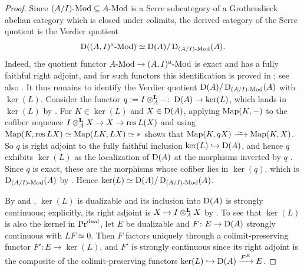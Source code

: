 	\begin{proof}
		Since $(A/I)\text{-}{\textup{Mod}} \subseteq A\text{-}{\textup{Mod}}$ is a Serre subcategory of a Grothendieck abelian category which is closed under colimits, the derived category of the Serre quotient is the Verdier quotient
		\[
			\operatorname{\mathrm{D}}((A,I)^a\text{-}{\textup{Mod}}) \simeq \operatorname{\mathrm{D}}(A)/\operatorname{\mathrm{D}}_{(A/I)\text{-}{\textup{Mod}}}(A).
		\]
		Indeed, the quotient functor $A\text{-}{\textup{Mod}} \to (A,I)^a\text{-}{\textup{Mod}}$ is exact and has a fully faithful right adjoint, and for such functors this identification is proved in \cite[Section~7.7]{Krause_Localization}; see also \cite[Example~2.26]{Efimov_Large_Categories}. It thus remains to identify the Verdier quotient $\operatorname{\mathrm{D}}(A)/\operatorname{\mathrm{D}}_{(A/I)\text{-}{\textup{Mod}}}(A)$ with $\ker(L)$. Consider the functor $q := I \otimes^{\mathbf{L}}_A -\colon \operatorname{\mathrm{D}}(A) \to \ker(L)$, which lands in $\ker(L)$ by . For $K \in \ker(L)$ and $X \in \operatorname{\mathrm{D}}(A)$, applying $\operatorname{Map}(K,-)$ to the cofiber sequence $I \otimes^{\mathbf{L}}_A X \to X \to \operatorname{res} L(X)$ and using $\operatorname{Map}(K,\operatorname{res} L X) \simeq \operatorname{Map}(LK,LX) \simeq *$ shows that $\Map(K,qX) \iso \Map(K,X)$. So $q$ is right adjoint to the fully faithful inclusion $\ker(L) \hookrightarrow \operatorname{\mathrm{D}}(A)$, and hence $q$ exhibits $\ker(L)$ as the localization of $\operatorname{\mathrm{D}}(A)$ at the morphisms inverted by $q$ \cite[Proposition~5.2.7.12]{lurie2009HTT}. Since $q$ is exact, these are the morphisms whose cofiber lies in $\ker(q)$, which is $\operatorname{\mathrm{D}}_{(A/I)\text{-}{\textup{Mod}}}(A)$ by . Hence $\ker(L) \simeq \operatorname{\mathrm{D}}(A)/\operatorname{\mathrm{D}}_{(A/I)\text{-}{\textup{Mod}}}(A)$.

		By  and , $\ker(L)$ is dualizable and its inclusion into $\operatorname{\mathrm{D}}(A)$ is strongly continuous; explicitly, its right adjoint is $X \mapsto I \otimes^{\mathbf{L}}_A X$ by . To see that $\ker(L)$ is also the kernel in $\textup{Pr}^{\operatorname{dual}}$, let $E$ be dualizable and $F\colon E \to \operatorname{\mathrm{D}}(A)$ strongly continuous with $LF \simeq 0$. Then $F$ factors uniquely through a colimit-preserving functor $F'\colon E \to \ker(L)$, and $F'$ is strongly continuous since its right adjoint is the composite of the colimit-preserving functors $\ker(L) \hookrightarrow \operatorname{\mathrm{D}}(A) \xrightarrow{F^R} E$.
	\end{proof}

